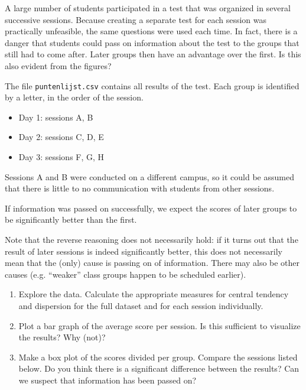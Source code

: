 \begin{exercise}
  A large number of students participated in a test that was organized in several successive sessions. Because creating a separate test for each session was practically unfeasible, the same questions were used each time. In fact, there is a danger that students could pass on information about the test to the groups that still had to come after. Later groups then have an advantage over the first. Is this also evident from the figures?
  
  The file \texttt{puntenlijst.csv} contains all results of the test. Each group is identified by a letter, in the order of the session.
  
  \begin{itemize}
    \item Day 1: sessions A, B
    \item Day 2: sessions C, D, E
    \item Day 3: sessions F, G, H
  \end{itemize}
  
  Sessions A and B were conducted on a different campus, so it could be assumed that there is little to no communication with students from other sessions.
  
  If information was passed on successfully, we expect the scores of later groups to be significantly better than the first.
  
  Note that the reverse reasoning does not necessarily hold: if it turns out that the result of later sessions is indeed significantly better, this does not necessarily mean that the (only) cause is passing on of information. There may also be other causes (e.g. ``weaker'' class groups happen to be scheduled earlier).

  \begin{enumerate}
    \item Explore the data. Calculate the appropriate measures for central tendency and dispersion for the full dataset and for each session individually.
    
    \item Plot a bar graph of the average score per session. Is this sufficient to visualize the results? Why (not)?
    
    \item Make a box plot of the scores divided per group. Compare the sessions listed below. Do you think there is a significant difference between the results? Can we suspect that information has been passed on?
    

\end{enumerate}
\end{exercise}
